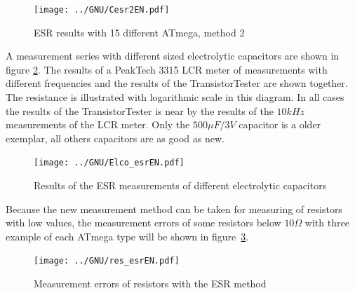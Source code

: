 \begin{figure}[H]
\centering
\texttt{[image: ../GNU/Cesr2EN.pdf]}
\caption{ESR results with 15 different ATmega, method 2}
\label{fig:Cesr2}
\end{figure}

A measurement series with different sized electrolytic capacitors are shown in figure \ref{fig:ElcoESR}.
The results of a PeakTech 3315 LCR meter of measurements with different frequencies and the results of the
TransistorTester are shown together. The resistance is illustrated with logarithmic scale in this diagram. 
In all cases the results of the TransistorTester is near by the results of
the \(10kHz\) measurements of the LCR meter.
Only the \(500\mu F/3V\) capacitor is a older exemplar, all others capacitors are as good as new.

\begin{figure}[H]
\centering
\texttt{[image: ../GNU/Elco\_esrEN.pdf]}
\caption{Results of the ESR measurements of different electrolytic capacitors}
\label{fig:ElcoESR}
\end{figure}


Because the new measurement method can be taken for measuring of resistors with low values, the
measurement errors of some resistors below \(10\Omega\) with three example of each ATmega type will be shown in
figure~\ref{fig:res_esr}. 

\begin{figure}[H]
\centering
\texttt{[image: ../GNU/res\_esrEN.pdf]}
\caption{Measurement errors of resistors with the ESR method}
\label{fig:res_esr}
\end{figure}

